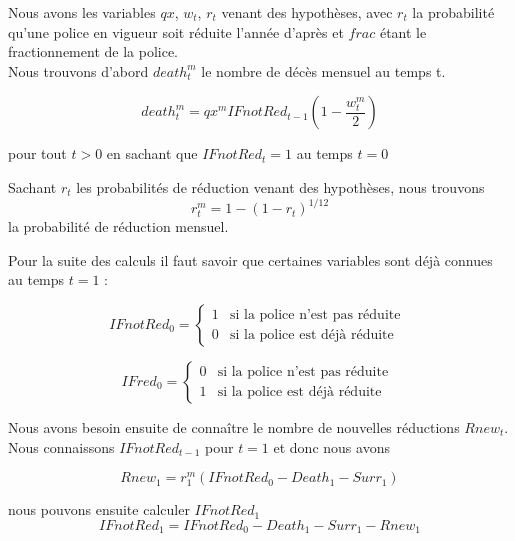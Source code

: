 \documentclass{article}
\begin{document}
Nous avons les variables $qx$, $w_t$, $r_t$ venant des hypothèses, avec $r_t$ la probabilité qu'une police en vigueur soit réduite l'année d'après et $frac$ étant le fractionnement de la police.\\

Nous trouvons d'abord $death_t^m$ le nombre de décès mensuel au temps t. 

\begin{equation}
  death_t^m = qx^m  IFnotRed_{t-1} (1-\frac{w^m_{t}}{2})      
\end{equation}

pour tout $t > 0$ en sachant que $IFnotRed_t = 1$ au temps $t = 0$


Sachant $r_t$ les probabilités de réduction venant des hypothèses, nous trouvons
\begin{equation}
      r_t^m= 1-(1-r_t)^{1/12}
\end{equation}
la probabilité de réduction mensuel.

Pour la suite des calculs il faut savoir que certaines variables sont déjà connues au temps $t=1$ :

\begin{equation}
\label{a}
IFnotRed_0 = \left\{
    \begin{array}{ll}
        1 & \mbox{si la police n'est pas réduite }\\
        0 & \mbox{si la police est déjà réduite}
    \end{array}
\right.
\end{equation}

\begin{equation}
 \label{eq-1}
IFred_0 = \left\{
    \begin{array}{ll}
        0 & \mbox{si la police n'est pas réduite }\\
        1 & \mbox{si la police est déjà réduite}
    \end{array}
\right.
\end{equation}


Nous avons besoin ensuite de connaître le nombre de nouvelles réductions $Rnew_t$. Nous connaissons $IFnotRed_{t-1}$ pour $t=1$ et donc nous avons

\begin{equation}
       Rnew_1= r_1^m (IFnotRed_{0}-Death_1-Surr_1)
\end{equation}

nous pouvons ensuite calculer $IFnotRed_1$
\begin{equation}
      IFnotRed_1 = IFnotRed_0 - Death_1 - Surr_1 - Rnew_1
\end{equation}
\end{document}
